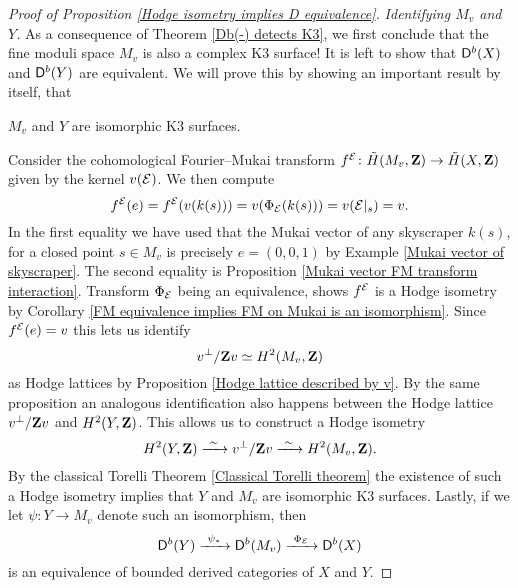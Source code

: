 \begin{proof}[Proof of Proposition \ref{Hodge isometry implies D equivalence}]
    \noindent
    \textsl{Identifying $M_v$ and $Y$.}
    As a consequence of Theorem \ref{Db(-) detects K3}, we first conclude that the fine moduli space $M_v$ is also a complex K3 surface!
    It is left to show that $\mathsf{D}^b(X)$ and $\mathsf{D}^b(Y)$ are equivalent. We will prove this by showing an important result by itself, that
    \begin{center}
        $M_v$ and $Y$ are isomorphic K3 surfaces.
    \end{center}
    Consider the cohomological Fourier--Mukai transform $f^{\mathcal E} \colon \,\tilde{\!{H}}(M_v, \mathbf Z) \to \,\tilde{\!{H}}(X, \mathbf Z)$ given by the kernel $v(\mathcal E)$. We then compute 
    \[
        f^{\mathcal E}(e) = f^{\mathcal E}(v(k(s))) = v(\Phi_{\mathcal E}(k(s))) = v(\mathcal E|_s) = v.
    \]
    In the first equality we have used that the Mukai vector of any skyscraper $k(s)$, for a closed point $s \in M_v$ is precisely $e = (0,0,1)$ by Example \ref{Mukai vector of skyscraper}. The second equality is Proposition \ref{Mukai vector FM transform interaction}. 
    Transform $\Phi_{\mathcal E}$ being an equivalence, shows $f^{\mathcal E}$ is a Hodge isometry by Corollary \ref{FM equivalence implies FM on Mukai is an isomorphism}. Since $f^{\mathcal E}(e) = v$ this lets us identify 
    \[
        {v}^\perp / \mathbf Z{v} \simeq H^{2}(M_v, \mathbf Z)
    \]
    as Hodge lattices by Proposition \ref{Hodge lattice described by v}. By the same proposition an analogous identification also happens between the Hodge lattice ${v}^\perp / \mathbf Z{v}$ and $H^{2}(Y, \mathbf Z)$. This allows us to construct a Hodge isometry
    \[
        H^{2}(Y, \mathbf Z) \xrightarrow{\ \sim \ } {v}^\perp / \mathbf Z{v} \xrightarrow{\ \sim \ } H^{2}(M_v, \mathbf Z).
    \]
    By the classical Torelli Theorem \ref{Classical Torelli theorem} the existence of such a Hodge isometry implies that $Y$ and $M_v$ are isomorphic K3 surfaces. Lastly, if we let $\psi \colon Y \to M_v$ denote such an isomorphism, then 
    \[
        \mathsf{D}^b(Y) \xrightarrow{\ \psi_* \ } \mathsf{D}^b(M_v) \xrightarrow{\ \Phi_{\mathcal E} \ } \mathsf{D}^b(X) 
    \]
    is an equivalence of bounded derived categories of $X$ and $Y$.
\end{proof}

